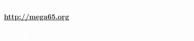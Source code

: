 
\begin{center}
\colorbox{white}{\EANisbn[SC4,ISBN=123-45-67890-12-8]}

\vspace*{\baselineskip}

\textbf{\textcolor{white}{the MEGA Museum of Electronic Games \& Art e.V. \url{http://mega65.org}}}

\textbf{\textcolor{white}{Editor: Dr. Paul Gardner-Stephen.}}

\end{center}





